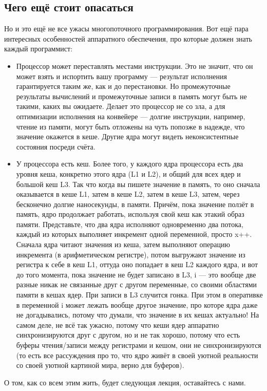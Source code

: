 \documentclass[a5paper]{article}
\begin{document}
\subsection{Чего ещё стоит опасаться}

Но и это ещё не все ужасы многопоточного программирования. Вот ещё пара интересных особенностей аппаратного обеспечения, про которые должен знать каждый программист:

\begin{itemize}
    \item Процессор может переставлять местами инструкции. Это не значит, что он может взять и испортить вашу программу --- результат исполнения гарантируется таким же, как и до перестановки. Но промежуточные результаты вычислений и промежуточные записи в память могут быть не такими, каких вы ожидаете. Делает это процессор не со зла, а для оптимизации исполнения на конвейере --- долгие инструкции, например, чтение из памяти, могут быть отложены на чуть попозже в надежде, что значение окажется в кеше. Другие ядра могут видеть неконсистентные состояния посреди счёта.
    \item У процессора есть кеш. Более того, у каждого ядра процессора есть два уровня кеша, конкретно этого ядра (L1 и L2), и общий для всех ядер и большой кеш L3. Так что когда вы пишете значение в память, то оно сначала оказывается в кеше L1, затем в кеше L2, затем в кеше L3, затем, через бесконечно долгие наносекунды, в памяти. Причём, пока значение ползёт в память, ядро продолжает работать, используя свой кеш как этакий образ памяти. Представьте, что два ядра исполняют одновременно два потока, каждый из которых выполняет инкремент одной переменной, просто x++. Сначала ядра читают значения из кеша, затем выполняют операцию инкремента (в арифметическом регистре), потом выгружают значение из регистра к себе в кеш L1, оттуда оно попадает в кеш L2 каждого ядра, и вот до того момента, пока значение не будет записано в L3, i --- это вообще две разные никак не связанные друг с другом переменные, со своими областями памяти в кешах ядер. При записи в L3 случится гонка. При этом в оперативке в переменной i может лежать вообще другое значение, про которе ядра даже не догадывались, потому что думали, что значение в их кешах актуально! На самом деле, не всё так ужасно, потому что кеши ядер аппаратно синхронизируются друг с другом, но и не так хорошо, потому что есть буферы чтения/записи между регистрами и кешом, они не синхронизируются (то есть все рассуждения про то, что ядро живёт в своей уютной реальности со своей уютной картиной мира, верно для буферов).
\end{itemize}

О том, как со всем этим жить, будет следующая лекция, оставайтесь с нами.
\end{document}
